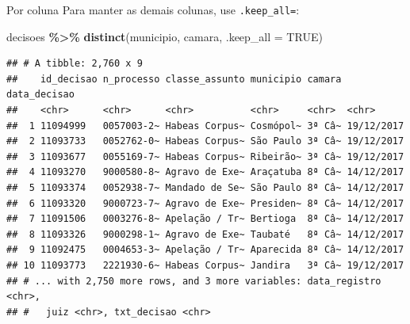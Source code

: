 \documentclass[
  9pt,
  ignorenonframetext,
]{beamer}
\newenvironment{Shaded}{\begin{snugshade}}{\end{snugshade}}
\newcommand{\DataTypeTok}[1]{\textcolor[rgb]{0.13,0.29,0.53}{#1}}
\newcommand{\KeywordTok}[1]{\textcolor[rgb]{0.13,0.29,0.53}{\textbf{#1}}}
\newcommand{\NormalTok}[1]{#1}
\newcommand{\OperatorTok}[1]{\textcolor[rgb]{0.81,0.36,0.00}{\textbf{#1}}}
\newcommand{\OtherTok}[1]{\textcolor[rgb]{0.56,0.35,0.01}{#1}}
\newcommand{\StringTok}[1]{\textcolor[rgb]{0.31,0.60,0.02}{#1}}
\begin{document}
\begin{frame}[fragile]{Por coluna}
\protect\hypertarget{por-coluna}{}
Para manter as demais colunas, use \texttt{.keep\_all=}:

\begin{Shaded}
\begin{Highlighting}[]
\NormalTok{decisoes }\OperatorTok{\%\textgreater{}\%}
\StringTok{  }\KeywordTok{distinct}\NormalTok{(municipio, camara, }
           \DataTypeTok{.keep\_all =} \OtherTok{TRUE}\NormalTok{)}
\end{Highlighting}
\end{Shaded}

\begin{verbatim}
## # A tibble: 2,760 x 9
##    id_decisao n_processo classe_assunto municipio camara data_decisao
##    <chr>      <chr>      <chr>          <chr>     <chr>  <chr>       
##  1 11094999   0057003-2~ Habeas Corpus~ Cosmópol~ 3ª Câ~ 19/12/2017  
##  2 11093733   0052762-0~ Habeas Corpus~ São Paulo 3ª Câ~ 19/12/2017  
##  3 11093677   0055169-7~ Habeas Corpus~ Ribeirão~ 3ª Câ~ 19/12/2017  
##  4 11093270   9000580-8~ Agravo de Exe~ Araçatuba 8ª Câ~ 14/12/2017  
##  5 11093374   0052938-7~ Mandado de Se~ São Paulo 8ª Câ~ 14/12/2017  
##  6 11093320   9000723-7~ Agravo de Exe~ Presiden~ 8ª Câ~ 14/12/2017  
##  7 11091506   0003276-8~ Apelação / Tr~ Bertioga  8ª Câ~ 14/12/2017  
##  8 11093326   9000298-1~ Agravo de Exe~ Taubaté   8ª Câ~ 14/12/2017  
##  9 11092475   0004653-3~ Apelação / Tr~ Aparecida 8ª Câ~ 14/12/2017  
## 10 11093773   2221930-6~ Habeas Corpus~ Jandira   3ª Câ~ 19/12/2017  
## # ... with 2,750 more rows, and 3 more variables: data_registro <chr>,
## #   juiz <chr>, txt_decisao <chr>
\end{verbatim}
\end{frame}
\end{document}
